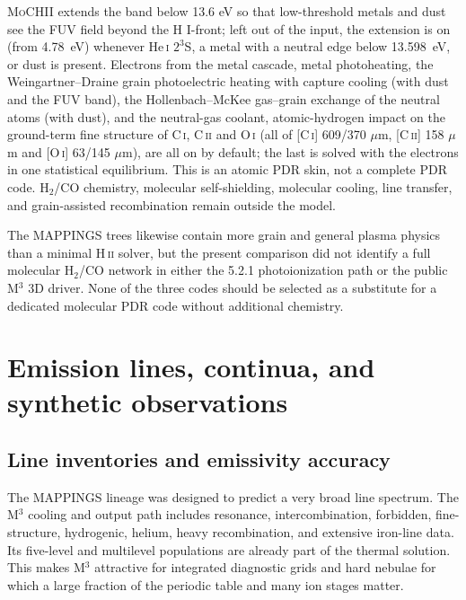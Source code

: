 \documentclass[english,a4paper]{my_memo}
\newcommand{\MoCHII}{\textsc{MoCHII}}
\newcommand{\Mthree}{M$^3$}
\newcommand{\HeI}{He\,\textsc{i}}
\begin{document}
\MoCHII{} extends the band below 13.6 eV so that low-threshold metals and
dust see the FUV field beyond the H I-front; left out of the input, the
extension is on (from 4.78~eV) whenever \HeI{} $2^3$S, a metal with a
neutral edge below 13.598~eV, or dust is present.  Electrons from the metal
cascade, metal photoheating, the Weingartner--Draine grain photoelectric
heating with capture cooling (with dust and the FUV band), the
Hollenbach--McKee gas--grain exchange of the neutral atoms (with dust), and
the neutral-gas coolant, atomic-hydrogen impact on the ground-term fine
structure of C\,\textsc{i}, C\,\textsc{ii} and O\,\textsc{i} (all of
[C\,\textsc{i}] 609/370 $\mu$m, [C\,\textsc{ii}] 158 $\mu$m and
[O\,\textsc{i}] 63/145 $\mu$m), are all on by default; the last is solved
with the electrons in one statistical equilibrium.
This is an atomic PDR skin, not a complete PDR code.  H$_2$/CO chemistry,
molecular self-shielding, molecular cooling, line transfer, and
grain-assisted recombination remain outside the model.

The MAPPINGS trees likewise contain more grain and general plasma physics
than a minimal H\,\textsc{ii} solver, but the present comparison did not
identify a full molecular H$_2$/CO network in either the 5.2.1
photoionization path or the public \Mthree{} 3D driver.  None of the three
codes should be selected as a substitute for a dedicated molecular PDR
code without additional chemistry.

\section{Emission lines, continua, and synthetic observations}

\subsection{Line inventories and emissivity accuracy}

The MAPPINGS lineage was designed to predict a very broad line spectrum.
The \Mthree{} cooling and output path includes resonance,
intercombination, forbidden, fine-structure, hydrogenic, helium, heavy
recombination, and extensive iron-line data.  Its five-level and
multilevel populations are already part of the thermal solution.  This
makes \Mthree{} attractive for integrated diagnostic grids and hard
nebulae for which a large fraction of the periodic table and many ion
stages matter.
\end{document}
